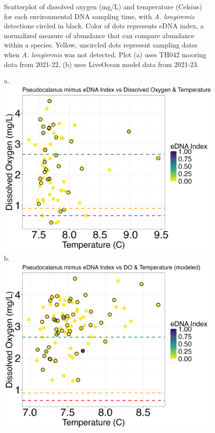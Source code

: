\documentclass[12pt,twoside]{reedthesis}
\begin{document}
{\begin{figure}[!h]
\begin{center}
			\caption[\textit{A. longiremis} scatterplot]{\footnotesize{Scatterplot of dissolved oxygen (mg/L) and temperature (Celsius) for each environmental DNA sampling time, with \textit{A. longiremis} detections circled in black. Color of dots represents eDNA index, a normalized measure of abundance that can compare abundance within a species. Yellow, uncircled dots represent sampling dates when \textit{A. longiremis} was not detected. Plot (a) uses TH042 mooring data from 2021-22, (b) uses LiveOcean model data from 2021-23.}} %
			\label{AlongiremisScatter}
		\end{center}
	\end{figure} 
	
	\begin{figure}[!h]
		\begin{center}
			a. \includegraphics[scale=0.3]{Pmimus_Scatter_noOut}
			b. \includegraphics[scale=0.3]{Pmimus_Scatter_AllYr_mod_noOut}

\end{center}
\end{figure}}
\end{document}
